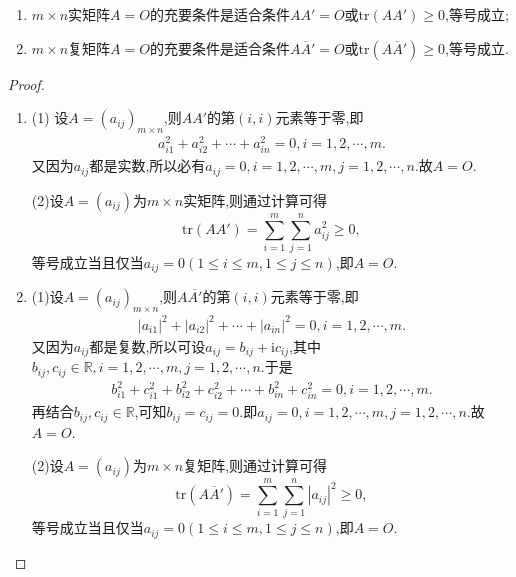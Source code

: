 \documentclass[../../main.tex]{subfiles}%
\begin{document}
\begin{proposition}[零矩阵的充要条件]\label{proposition:零矩阵的充要条件}
\begin{enumerate}
\item \(m\times n\)实矩阵\(A = O\)的充要条件是适合条件\(AA' = O\)或\(\mathrm{tr}(AA')\geqslant 0\),等号成立;

\item \(m\times n\)复矩阵\(A = O\)的充要条件是适合条件\(A\overline{A}'= O\)或\(\mathrm{tr}(A\overline{A}')\geqslant 0\),等号成立.
\end{enumerate}
\end{proposition}
\begin{proof}
\begin{enumerate}
\item (1) 设\(A=(a_{ij})_{m\times n}\),则\(AA'\)的第\((i,i)\)元素等于零,即
\begin{align*}
a_{i1}^{2}+a_{i2}^{2}+\cdots +a_{in}^{2}=0,i=1,2,\cdots,m.
\end{align*}
又因为\(a_{ij}\)都是实数,所以必有\(a_{ij}=0,i=1,2,\cdots,m,j=1,2,\cdots,n\).故$A=O$.

(2)设\(A=(a_{ij})\)为\(m\times n\)实矩阵,则通过计算可得
\[
\mathrm{tr}(AA')=\sum_{i = 1}^{m}\sum_{j = 1}^{n}a_{ij}^2\geqslant 0,
\]
等号成立当且仅当\(a_{ij}=0(1\leqslant  i\leqslant  m,1\leqslant  j\leqslant  n)\),即\(A = O\).

\item (1)设\(A=(a_{ij})_{m\times n}\),则\(A\overline{A'}\)的第\((i,i)\)元素等于零,即
\begin{align*}
\left| a_{i1} \right|^2+\left| a_{i2} \right|^2+\cdots +\left| a_{in} \right|^2=0,i=1,2,\cdots ,m.
\end{align*}
又因为\(a_{ij}\)都是复数,所以可设$a_{ij}=b_{ij}+\mathrm{i}c_{ij}$,其中$b_{ij},c_{ij}\in \mathbb{R},i=1,2,\cdots,m,j=1,2,\cdots,n$.于是
\begin{align*}
b_{i1}^{2}+c_{i1}^{2}+b_{i2}^{2}+c_{i2}^{2}+\cdots +b_{in}^{2}+c_{in}^{2}=0,i=1,2,\cdots ,m.
\end{align*}
再结合$b_{ij},c_{ij}\in \mathbb{R}$,可知\(b_{ij}=c_{ij}=0\).即\(a_{ij}=0,i=1,2,\cdots,m,j=1,2,\cdots,n\).故$A=O$.

(2)设\(A=(a_{ij})\)为\(m\times n\)复矩阵,则通过计算可得
\[
\mathrm{tr}(A\overline{A}')=\sum_{i = 1}^{m}\sum_{j = 1}^{n}|a_{ij}|^2\geqslant 0,
\]
等号成立当且仅当\(a_{ij}=0(1\leqslant  i\leqslant  m,1\leqslant  j\leqslant  n)\),即\(A = O\).
\end{enumerate}



\end{proof}
\end{document}
